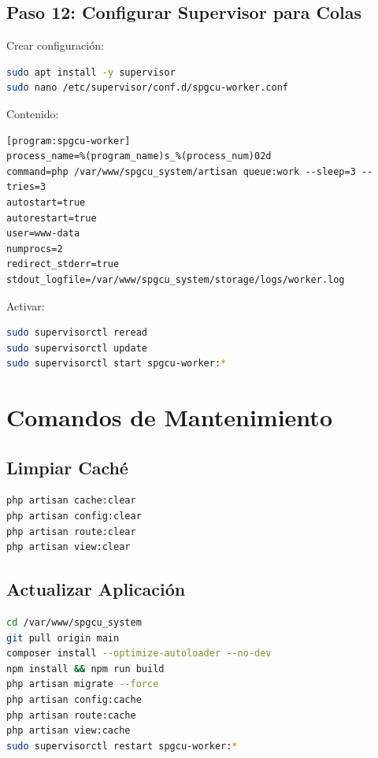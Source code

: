 \documentclass[12pt,a4paper]{article}
\begin{document}
\subsection{Paso 12: Configurar Supervisor para Colas}

Crear configuración:
\begin{lstlisting}[language=bash]
sudo apt install -y supervisor
sudo nano /etc/supervisor/conf.d/spgcu-worker.conf
\end{lstlisting}

Contenido:
\begin{lstlisting}
[program:spgcu-worker]
process_name=%(program_name)s_%(process_num)02d
command=php /var/www/spgcu_system/artisan queue:work --sleep=3 --tries=3
autostart=true
autorestart=true
user=www-data
numprocs=2
redirect_stderr=true
stdout_logfile=/var/www/spgcu_system/storage/logs/worker.log
\end{lstlisting}

Activar:
\begin{lstlisting}[language=bash]
sudo supervisorctl reread
sudo supervisorctl update
sudo supervisorctl start spgcu-worker:*
\end{lstlisting}

\section{Comandos de Mantenimiento}

\subsection{Limpiar Caché}
\begin{lstlisting}[language=bash]
php artisan cache:clear
php artisan config:clear
php artisan route:clear
php artisan view:clear
\end{lstlisting}

\subsection{Actualizar Aplicación}
\begin{lstlisting}[language=bash]
cd /var/www/spgcu_system
git pull origin main
composer install --optimize-autoloader --no-dev
npm install && npm run build
php artisan migrate --force
php artisan config:cache
php artisan route:cache
php artisan view:cache
sudo supervisorctl restart spgcu-worker:*
\end{lstlisting}
\end{document}
